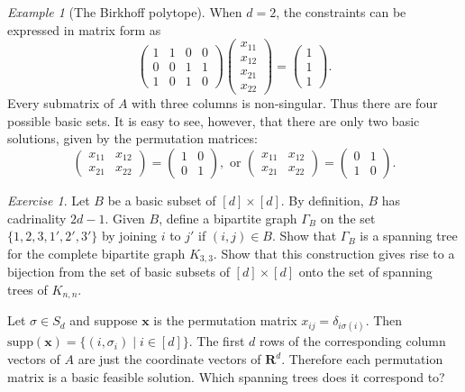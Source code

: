 \documentclass{amsbook}
\newcommand{\xx}{\mathbf x}
\newcommand{\supp}{\mathrm{supp}}
\newcommand{\RR}{\mathbf R}
\theoremstyle{definition}
\theoremstyle{remark}
\newtheorem{example}[theorem]{Example}
\newtheorem{exercise}[theorem]{Exercise}
\begin{document}
\begin{example}[The Birkhoff polytope]
  When $d=2$, the constraints can be expressed in matrix form as
  \begin{equation}
    \label{eq:birkhoff2}
    \begin{pmatrix}
      1 & 1 & 0 & 0\\
      0 & 0 & 1 & 1\\
      1 & 0 & 1 & 0
    \end{pmatrix}
    \begin{pmatrix}
      x_{11}\\x_{12}\\x_{21}\\x_{22}
    \end{pmatrix}
    =
    \begin{pmatrix}
     1\\1\\1
    \end{pmatrix}.
  \end{equation}
  Every submatrix of $A$ with three columns is non-singular.
  Thus there are four possible basic sets.
  It is easy to see, however, that there are only two basic solutions, given by the permutation matrices:
  \begin{displaymath}
    \begin{pmatrix}
      x_{11} & x_{12}\\
      x_{21} & x_{22}
    \end{pmatrix}
    =
    \begin{pmatrix}
      1 & 0\\
      0 & 1
    \end{pmatrix}, \text{ or }
    \begin{pmatrix}
      x_{11} & x_{12}\\
      x_{21} & x_{22}
    \end{pmatrix}
    =
    \begin{pmatrix}
      0 & 1\\
      1 & 0
    \end{pmatrix}.
  \end{displaymath}
  \begin{exercise}
    Let $B$ be a basic subset of $[d]\times [d]$.
    By definition, $B$ has cadrinality $2d-1$.
    Given $B$, define a bipartite graph $\Gamma_B$ on the set $\{1,2,3,1',2',3'\}$ by joining $i$ to $j'$ if $(i,j)\in B$.
    Show that $\Gamma_B$ is a spanning tree for the complete bipartite graph $K_{3,3}$.
    Show that this construction gives rise to a bijection from the set of basic subsets of $[d]\times[d]$ onto the set of spanning trees of $K_{n,n}$.
  \end{exercise}
  Let $\sigma\in S_d$ and suppose $\xx$ is the permutation matrix $x_{ij}=\delta_{i\sigma(i)}$.
  Then $\supp(\xx)=\{(i,\sigma_i)\mid i\in [d]\}$.
  The first $d$ rows of the corresponding column vectors of $A$ are just the coordinate vectors of $\RR^d$.
  Therefore each permutation matrix is a basic feasible solution.
  Which spanning trees does it correspond to?
\end{example}
\end{document}
